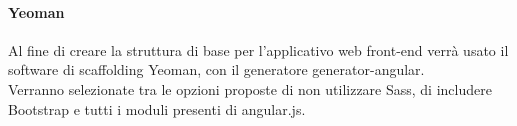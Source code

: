 			\paragraph{Yeoman}
			\label{par:yeoman}
			Al fine di creare la struttura di base per l'applicativo web front-end verrà usato il software di scaffolding Yeoman, con il generatore generator-angular.\\ 
			Verranno selezionate tra le opzioni proposte di non utilizzare Sass, di includere Bootstrap e tutti i moduli presenti di angular.js.
			
			 